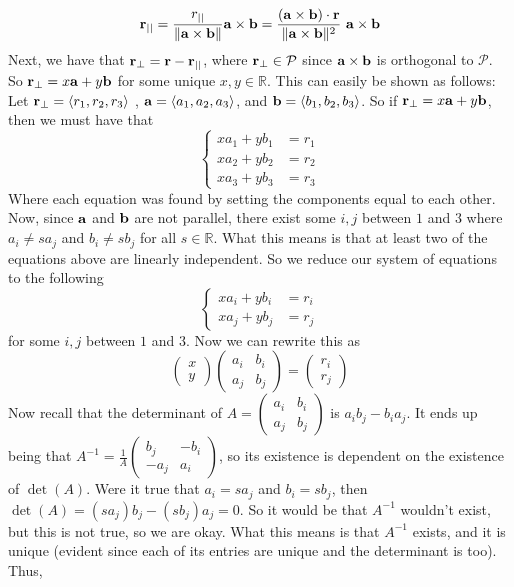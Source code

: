 \documentclass[12pt]{amsbook}
\newcommand{\la}{\langle}
\newcommand{\ra}{\rangle}
\begin{document}
$${\bf r}_{||}=\frac{r_{||}}{\|{\bf a}\times{\bf b}\|}{\bf a}\times{\bf b}=\frac{({\bf a}\times{\bf b})\cdot{\bf r}}{\|{\bf a}\times{\bf b}\|^2} \ {\bf a}\times{\bf b}$$
Next, we have that ${\bf r}_\perp={\bf r}-{\bf r}_{||}$, where ${\bf r}_\perp \in \mathcal{P}$ since ${\bf a}\times{\bf b}$ is orthogonal to $\mathcal{P}$. So ${\bf r}_\perp=x{\bf a}+y{\bf b}$ for some unique $x,y\in \mathbb{R}$. This can easily be shown as follows: Let ${\bf r}_\perp=\la r_1,r_2,r_3 \ra$ , ${\bf a}=\la a_1,a_2,a_3\ra$, and ${\bf b}=\la b_1,b_2,b_3 \ra$. So if ${\bf r}_\perp=x{\bf a}+y{\bf b}$, then we must have that
$$ \begin{cases} 
xa_1+yb_1&=r_1 \\
xa_2+yb_2&=r_2 \\
xa_3+yb_3&=r_3 
\end{cases}$$ 
Where each equation was found by setting the components equal to each other. Now, since ${\bf a}$ and $\bf b$ are not parallel, there exist some $i,j$ between $1$ and $3$ where $a_i \neq sa_j$ and $b_i \neq sb_j$ for all $s\in \mathbb{R}$. What this means is that at least two of the equations above are linearly independent. So we reduce our system of equations to the following
$$ \begin{cases} 
xa_i+yb_i&=r_i \\
xa_j+yb_j&=r_j 
\end{cases}$$ 
for some $i,j$ between $1$ and $3$. Now we can rewrite this as
$$\begin{pmatrix} x\\ y \end{pmatrix}\begin{pmatrix}
a_i & b_i \\ a_j & b_j \end{pmatrix} = \begin{pmatrix} r_i\\ r_j \end{pmatrix}$$
Now recall that the determinant of $A=\begin{pmatrix}
a_i & b_i \\ a_j & b_j \end{pmatrix}$ is $a_ib_j-b_ia_j$. It ends up being that $A^{-1}= \frac{1}{A}\begin{pmatrix} b_j & -b_i \\ -a_j & a_i \end{pmatrix}$, so its existence is dependent on the existence of $\det(A)$. Were it true that $a_i=sa_j$ and $b_i=sb_j$, then $\det(A)=(sa_j)b_j-(sb_j)a_j=0$. So it would be that $A^{-1}$ wouldn't exist, but this is not true, so we are okay. What this means is that $A^{-1}$ exists, and it is unique (evident since each of its entries are unique and the determinant is too). Thus, 
\end{document}
